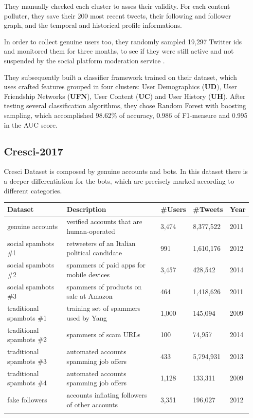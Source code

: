 They manually checked each cluster to asses their validity.
For each content polluter, they save their 200 most recent tweets, their following and follower graph, and the temporal and historical profile informations.

In order to collect genuine users too, they randomly sampled 19,297 Twitter ids and monitored them for three months, to see if they were still active and not suspended by the social platform moderation service \cite{Lee11sevenmonths}.

They subsequently built a classifier framework trained on their dataset, which uses crafted features grouped in four clusters:
User Demographics (\textbf{UD}), User Friendship Networks (\textbf{UFN}), User Content (\textbf{UC}) and User History (\textbf{UH}).
After testing several classification algorithms, they chose Random Forest with boosting sampling, which accomplished 98.62\% of accuracy, 0.986 of F1-measure and 0.995 in the AUC score.

\subsection{Cresci-2017}
Cresci Dataset is composed by genuine accounts and bots. In this dataset there is a deeper differentiation for the bots, which are precisely marked according to different categories.

\tiny
\begin{center}
\begin{tabular}{lllll}
	Dataset&Description&\#Users&\#Tweets&Year\\ \hline\hline
	genuine accounts&
	verified accounts that are human-operated&
	3,474&
	8,377,522
	&2011\\
	social spambots \#1&
	retweeters of an Italian political candidate&
	991&
	1,610,176&
	2012 \\
	social spambots \#2&
	spammers of paid apps for mobile devices&
	3,457&
	428,542&
	2014 \\
	social spambots \#3&
	spammers of products on sale at	Amazon&
	464&
	1,418,626&
	2011 \\
	traditional spambots \#1&
	training set of spammers used by Yang \cite{Yang}&
	1,000&
	145,094&
	2009 \\
	traditional spambots \#2&
	spammers of scam URLs&
	100&
	74,957&
	2014 \\
	traditional spambots \#3&
	automated accounts spamming job offers&
	433&
	5,794,931&
	2013 \\
	traditional spambots \#4&
	automated accounts spamming job offers&
	1,128&
	133,311&
	2009 \\
	fake followers&
	accounts inflating followers of other accounts&
	3,351&
	196,027&
	2012 \\ \hline\\
	
\end{tabular}
\end{center}

